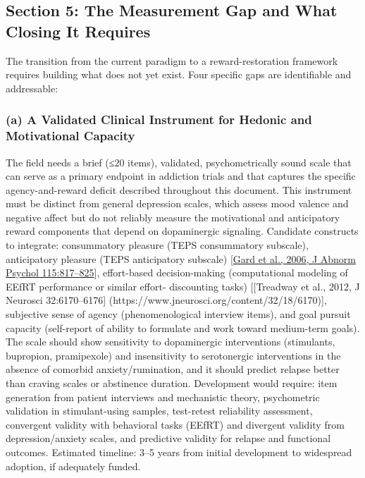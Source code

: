 \subsection{Section 5: The Measurement Gap and What Closing It Requires}\label{18_restoration-section-5-the-measurement-gap-and-what-closing-it-requires}

The transition from the current paradigm to a reward-restoration framework requires building what does not yet exist. Four specific gaps are identifiable and addressable:

\subsubsection{(a) A Validated Clinical Instrument for Hedonic and Motivational Capacity}\label{18_restoration-a-a-validated-clinical-instrument-for-hedonic-and-motivational-capacity}

The field needs a brief (≤20 items), validated, psychometrically sound scale that can serve as a primary endpoint in addiction trials and that captures the specific agency-and-reward deficit described throughout this document. This instrument must be distinct from general depression scales, which assess mood valence and negative affect but do not reliably measure the motivational and anticipatory reward components that depend on dopaminergic signaling. Candidate constructs to integrate: consummatory pleasure (TEPS consummatory subscale), anticipatory pleasure (TEPS anticipatory subscale) {[}\href{https://pubmed.ncbi.nlm.nih.gov/17100538/}{Gard et al., 2006, J Abnorm Psychol 115:817--825}{]}, effort-based decision-making (computational modeling of EEfRT performance or similar effort- discounting tasks) {[}{[}Treadway et al., 2012, J Neurosci 32:6170--6176{]} (https://www.jneurosci.org/content/32/18/6170){]}, subjective sense of agency (phenomenological interview items), and goal pursuit capacity (self-report of ability to formulate and work toward medium-term goals). The scale should show sensitivity to dopaminergic interventions (stimulants, bupropion, pramipexole) and insensitivity to serotonergic interventions in the absence of comorbid anxiety/rumination, and it should predict relapse better than craving scales or abstinence duration. Development would require: item generation from patient interviews and mechanistic theory, psychometric validation in stimulant-using samples, test-retest reliability assessment, convergent validity with behavioral tasks (EEfRT) and divergent validity from depression/anxiety scales, and predictive validity for relapse and functional outcomes. Estimated timeline: 3--5 years from initial development to widespread adoption, if adequately funded.

